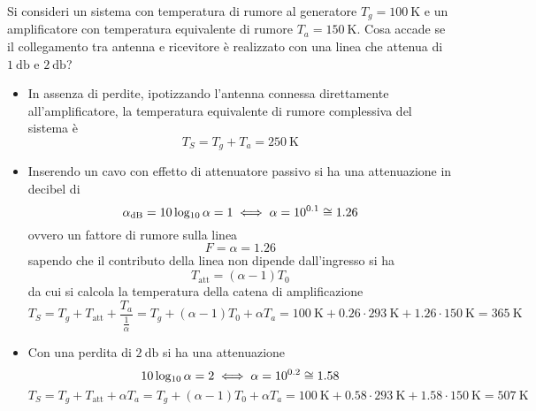 \begin{esempio}
	Si consideri un sistema con temperatura di rumore al generatore $T_g=\SI{100}{\kelvin}$ e un amplificatore con temperatura equivalente di rumore $T_a=\SI{150}{\kelvin}$. Cosa accade se il collegamento tra antenna e ricevitore è realizzato con una linea che attenua di $\SI{1}{\decibel}$ e $\SI{2}{\decibel}$?
	
	\begin{itemize}
		\item In assenza di perdite, ipotizzando l'antenna connessa direttamente all'amplificatore, la temperatura equivalente di rumore complessiva del sistema è
		\[T_S=T_g+T_a=\SI{250}{\kelvin}\]
		\item Inserendo un cavo con effetto di attenuatore passivo si ha una attenuazione in decibel di 
		\[\alpha_\text{dB}=10\operatorname{log_{10}}\alpha=1 \iff \alpha=10^{0.1}\cong\num{1.26}\]
		ovvero un fattore di rumore sulla linea
		\[ F= \alpha= \num{1.26}\]
		sapendo che il contributo della linea non dipende dall'ingresso si ha
		\[ T_\text{att}=(\alpha-1) T_0 \]
		da cui si calcola la temperatura della catena di amplificazione
		\[ T_S=T_g+T_\text{att}+\frac{ T_a }{\frac{1}{\alpha}}= T_g+(\alpha-1)T_0+\alpha T_a=\SI{100}{\kelvin}+0.26\cdot\SI{293}{\kelvin}+1.26\cdot\SI{150}{\kelvin}=\SI{365}{\kelvin}\]
		
		\item Con una perdita di $\SI{2}{\decibel}$ si ha una attenuazione
		\[10\operatorname{log_{10}}\alpha=2 \iff \alpha=10^{0.2}\cong\num{1.58}\]
		\[ T_S=T_g+T_\text{att}+\alpha T_a= T_g+(\alpha-1)T_0+\alpha T_a=\SI{100}{\kelvin}+0.58\cdot\SI{293}{\kelvin}+1.58\cdot\SI{150}{\kelvin}=\SI{507}{\kelvin}\]
	\end{itemize}
\end{esempio}

